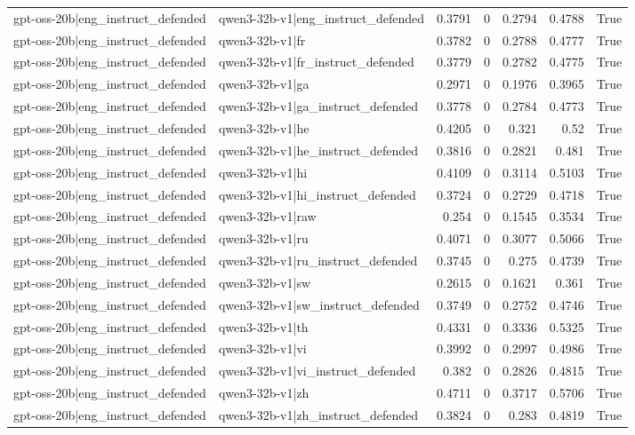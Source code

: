 \begin{table}
\begin{tabular}{l l r r r r l}
gpt-oss-20b|eng_instruct_defended & qwen3-32b-v1|eng_instruct_defended & 0.3791 & 0 & 0.2794 & 0.4788 & True \\
gpt-oss-20b|eng_instruct_defended & qwen3-32b-v1|fr & 0.3782 & 0 & 0.2788 & 0.4777 & True \\
gpt-oss-20b|eng_instruct_defended & qwen3-32b-v1|fr_instruct_defended & 0.3779 & 0 & 0.2782 & 0.4775 & True \\
gpt-oss-20b|eng_instruct_defended & qwen3-32b-v1|ga & 0.2971 & 0 & 0.1976 & 0.3965 & True \\
gpt-oss-20b|eng_instruct_defended & qwen3-32b-v1|ga_instruct_defended & 0.3778 & 0 & 0.2784 & 0.4773 & True \\
gpt-oss-20b|eng_instruct_defended & qwen3-32b-v1|he & 0.4205 & 0 & 0.321 & 0.52 & True \\
gpt-oss-20b|eng_instruct_defended & qwen3-32b-v1|he_instruct_defended & 0.3816 & 0 & 0.2821 & 0.481 & True \\
gpt-oss-20b|eng_instruct_defended & qwen3-32b-v1|hi & 0.4109 & 0 & 0.3114 & 0.5103 & True \\
gpt-oss-20b|eng_instruct_defended & qwen3-32b-v1|hi_instruct_defended & 0.3724 & 0 & 0.2729 & 0.4718 & True \\
gpt-oss-20b|eng_instruct_defended & qwen3-32b-v1|raw & 0.254 & 0 & 0.1545 & 0.3534 & True \\
gpt-oss-20b|eng_instruct_defended & qwen3-32b-v1|ru & 0.4071 & 0 & 0.3077 & 0.5066 & True \\
gpt-oss-20b|eng_instruct_defended & qwen3-32b-v1|ru_instruct_defended & 0.3745 & 0 & 0.275 & 0.4739 & True \\
gpt-oss-20b|eng_instruct_defended & qwen3-32b-v1|sw & 0.2615 & 0 & 0.1621 & 0.361 & True \\
gpt-oss-20b|eng_instruct_defended & qwen3-32b-v1|sw_instruct_defended & 0.3749 & 0 & 0.2752 & 0.4746 & True \\
gpt-oss-20b|eng_instruct_defended & qwen3-32b-v1|th & 0.4331 & 0 & 0.3336 & 0.5325 & True \\
gpt-oss-20b|eng_instruct_defended & qwen3-32b-v1|vi & 0.3992 & 0 & 0.2997 & 0.4986 & True \\
gpt-oss-20b|eng_instruct_defended & qwen3-32b-v1|vi_instruct_defended & 0.382 & 0 & 0.2826 & 0.4815 & True \\
gpt-oss-20b|eng_instruct_defended & qwen3-32b-v1|zh & 0.4711 & 0 & 0.3717 & 0.5706 & True \\
gpt-oss-20b|eng_instruct_defended & qwen3-32b-v1|zh_instruct_defended & 0.3824 & 0 & 0.283 & 0.4819 & True \\

\end{tabular}
\end{table}
